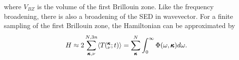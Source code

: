 \documentclass[letterpaper,12pt]{article}
\newcommand{\kvt}{\mspace{-4.0mu}\left(\mspace{-8.0mu}\begin{smallmatrix}&\pmb{\kappa} \\&\nu\end{smallmatrix}\mspace{-2.0mu};t\right)}
\newcommand{\kv}{\mspace{-4.0mu}\left(\mspace{-8.0mu}\begin{smallmatrix}&\pmb{\kappa} \\&\nu\end{smallmatrix}\mspace{-3.0mu}\right)}
\begin{document}
where $V_{BZ}$ is the volume of the first Brillouin zone. Like the frequency broadening, there is also a broadening of the SED in wavevector.\cite{turneythesis} For a finite sampling of the first Brillouin zone, the Hamiltonian can be approximated by
\begin{equation}\label{A:E:equipartition}
\begin{split}
H \approx 2\sum_{\pmb{\kappa},\nu}^{N,3n}\langle T\kvt\rangle = \sum_{\pmb{\kappa}}^N \int_{0}^{\infty}\Phi(\omega,\pmb{\kappa})d\omega.
\end{split}
\end{equation}
%
%
%
%
%
%
%
%
%
\end{document}
